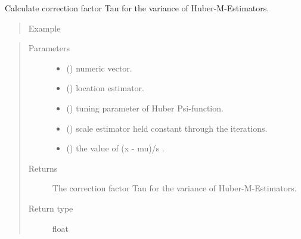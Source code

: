 \documentclass[letterpaper,10pt,english]{sphinxmanual}
\begin{document}

\begin{fulllineitems}
\label{\detokenize{_modules/lmrob:lmrob.utils.tauHuber}}
Calculate correction factor Tau for the variance of Huber-M-Estimators.
\begin{quote}\begin{description}
\item[{Example}] \leavevmode
\end{description}\end{quote}

%
\begin{sphinxVerbatim}[commandchars=\\\{\}]
\PYG{p}{[}\PYG{p}{]}
\end{sphinxVerbatim}
\begin{quote}\begin{description}
\item[{Parameters}] \leavevmode\begin{itemize}
\item {} 
 () \textendash{} numeric vector.

\item {} 
 () \textendash{} location estimator.

\item {} 
 () \textendash{} tuning parameter of Huber Psi-function.

\item {} 
 () \textendash{} scale estimator held constant through the iterations.

\item {} 
 () \textendash{} the value of (x - mu)/s .

\end{itemize}

\item[{Returns}] \leavevmode
The correction factor Tau for the variance of Huber-M-Estimators.

\item[{Return type}] \leavevmode
float

\end{description}\end{quote}

\end{fulllineitems}
\end{document}
